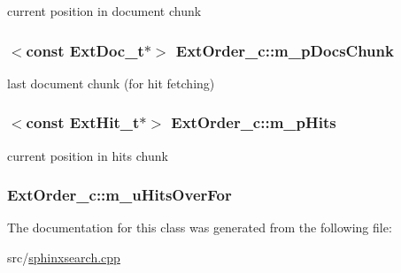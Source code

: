 current position in document chunk 

\hypertarget{classExtOrder__c_a1cc05abe8ceafbaeae482dee243a2a4c}{
\subsubsection[{m\-\_\-p\-Docs\-Chunk}]{$<$const {\bf Ext\-Doc\-\_\-t}$\ast$$>$ Ext\-Order\-\_\-c\-::m\-\_\-p\-Docs\-Chunk\hspace{0.3cm}{\ttfamily [protected]}}}\label{classExtOrder__c_a1cc05abe8ceafbaeae482dee243a2a4c}


last document chunk (for hit fetching) 

\hypertarget{classExtOrder__c_ae73b6cbef01083be1b9ddb418f3c7500}{
\subsubsection[{m\-\_\-p\-Hits}]{$<$const {\bf Ext\-Hit\-\_\-t}$\ast$$>$ Ext\-Order\-\_\-c\-::m\-\_\-p\-Hits\hspace{0.3cm}{\ttfamily [protected]}}}\label{classExtOrder__c_ae73b6cbef01083be1b9ddb418f3c7500}


current position in hits chunk 

\hypertarget{classExtOrder__c_ad76731b2aab874bdd3d5c5cf96ddc86c}{
\subsubsection[{m\-\_\-u\-Hits\-Over\-For}]{ Ext\-Order\-\_\-c\-::m\-\_\-u\-Hits\-Over\-For\hspace{0.3cm}{\ttfamily [protected]}}}\label{classExtOrder__c_ad76731b2aab874bdd3d5c5cf96ddc86c}


The documentation for this class was generated from the following file\-:\begin{DoxyCompactItemize}
\item 
src/\hyperlink{sphinxsearch_8cpp}{sphinxsearch.\-cpp}\end{DoxyCompactItemize}
